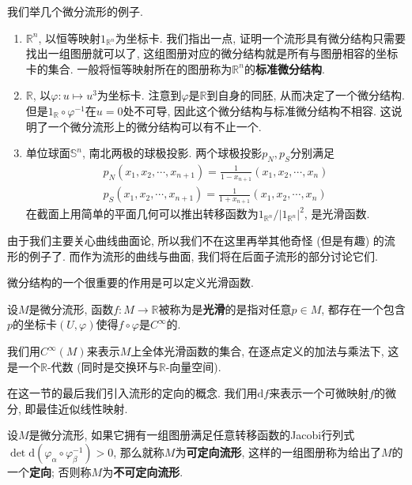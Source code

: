 \begin{eg}我们举几个微分流形的例子.
    \begin{enumerate}[(1)]
        \item $\mathbb{R}^n$, 以恒等映射$1_{\mathbb{R}^n}$为坐标卡.
        我们指出一点, 证明一个流形具有微分结构只需要找出一组图册就可以了, 这组图册对应的微分结构就是所有与图册相容的坐标卡的集合.
        一般将恒等映射所在的图册称为$\mathbb{R}^n$的\textbf{标准微分结构}.
        \item $\mathbb{R}$, 以$\varphi:u\mapsto u^3$为坐标卡.
        注意到$\varphi$是$\mathbb{R}$到自身的同胚, 从而决定了一个微分结构.
        但是$1_{\mathbb{R}}\circ\varphi^{-1}$在$u=0$处不可导, 因此这个微分结构与标准微分结构不相容.
        这说明了一个微分流形上的微分结构可以有不止一个.
        \item 单位球面$\mathbb{S}^n$, 南北两极的球极投影. 两个球极投影$p_N,p_S$分别满足
        \begin{gather*}
            p_N(x_1,x_2,\cdots,x_{n+1})=\frac{1}{1-x_{n+1}}(x_1,x_2,\cdots,x_n)\\
            p_S(x_1,x_2,\cdots,x_{n+1})=\frac{1}{1+x_{n+1}}(x_1,x_2,\cdots,x_n)
        \end{gather*}
        在截面上用简单的平面几何可以推出转移函数为$1_{\mathbb{R}^n}/|1_{\mathbb{R}^n}|^2$, 是光滑函数.
    \end{enumerate}
\end{eg}
由于我们主要关心曲线曲面论, 所以我们不在这里再举其他奇怪 (但是有趣) 的流形的例子了.
而作为流形的曲线与曲面, 我们将在后面子流形的部分讨论它们.

微分结构的一个很重要的作用是可以定义光滑函数.
\begin{defn}\label{smooth function 1}
    设$M$是微分流形, 函数$f:M\to\mathbb{R}$被称为是\textbf{光滑}的是指对任意$p\in M$, 都存在一个包含$p$的坐标卡$(U,\varphi)$使得$f\circ\varphi$是$C^\infty$的.
\end{defn}

\begin{sym}
    我们用$C^\infty(M)$来表示$M$上全体光滑函数的集合, 在逐点定义的加法与乘法下, 这是一个$\mathbb{R}$-代数 (同时是交换环与$\mathbb{R}$-向量空间).
\end{sym}

在这一节的最后我们引入流形的定向的概念.
我们用$\mathrm{d}f$来表示一个可微映射$f$的微分, 即最佳近似线性映射.
\begin{defn}
    设$M$是微分流形, 如果它拥有一组图册满足任意转移函数的Jacobi行列式$\det\mathrm{d}(\varphi_\alpha\circ\varphi_\beta^{-1})>0$, 那么就称$M$为\textbf{可定向流形}, 这样的一组图册称为给出了$M$的一个\textbf{定向}; 否则称$M$为\textbf{不可定向流形}.
\end{defn}

